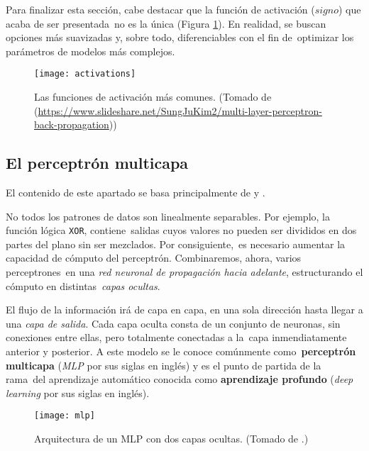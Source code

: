 Para finalizar esta sección, cabe destacar que la función de activación ($signo$) que acaba de ser presentada\
no es la única (Figura \ref{activations}). En realidad, se buscan opciones más suavizadas y, sobre todo, diferenciables con el fin de\
optimizar los parámetros de modelos más complejos.

\begin{figure}[H]
  \centering
  \texttt{[image: activations]}
  \caption{Las funciones de activación más comunes.
    (Tomado de (\url{https://www.slideshare.net/SungJuKim2/multi-layer-perceptron-back-propagation}))}
  \label{activations}
\end{figure}

\subsection{El perceptrón multicapa}

\noindent
El contenido de este apartado se basa principalmente de \cite{haykin2009} y \cite{rojas1996}.\par
No todos los patrones de datos son linealmente separables. Por ejemplo, la función lógica \verb+XOR+, contiene\
salidas cuyos valores no pueden ser divididos en dos partes del plano sin ser mezclados. Por consiguiente,\
es necesario aumentar la capacidad de cómputo del perceptrón. Combinaremos, ahora, varios perceptrones\
en una \emph{red neuronal de propagación hacia adelante}, estructurando el cómputo en distintas\
\emph{capas ocultas}.\par
El flujo de la información irá de capa en capa, en una sola dirección hasta llegar a una \emph{capa de salida}.
Cada capa oculta consta de un conjunto de neuronas, sin conexiones entre ellas, pero totalmente conectadas a la\
capa inmendiatamente anterior y posterior. A este modelo se le conoce comúnmente como\
\textbf{perceptrón multicapa} (\emph{MLP} por sus siglas en inglés) y es el punto de partida de la rama\
del aprendizaje automático conocida como \textbf{aprendizaje profundo} (\emph{deep learning} por sus siglas en inglés).

\begin{figure}[H]
  \centering
  \texttt{[image: mlp]}
  \caption{Arquitectura de un MLP con dos capas ocultas.
    (Tomado de \cite{haykin2009}.)}
\end{figure}

